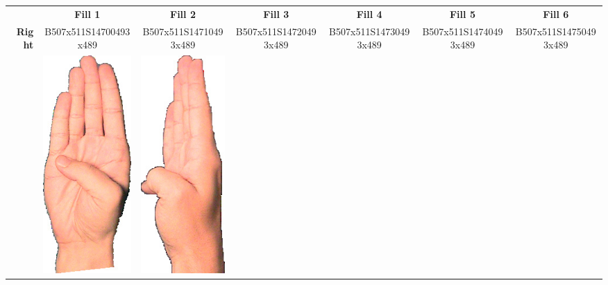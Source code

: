 \documentclass{article}
\begin{document}
\begin{center}
\begin{tabular}{r*{6}{c}}
&\textbf{Fill 1}&\textbf{Fill 2}&\textbf{Fill 3}&\textbf{Fill 4}&\textbf{Fill 5}&\textbf{Fill 6}\\
\multirow{2}{*}{\textbf{Right}}&
B507x511S14700493x489&
B507x511S14710493x489&
B507x511S14720493x489&
B507x511S14730493x489&
B507x511S14740493x489&
B507x511S14750493x489\\
&
\includegraphics[scale=0.1]{images/04-03-1.jpg}&
\includegraphics[scale=0.1]{images/04-03-2.jpg}&

\end{tabular}
\end{center}
\end{document}
